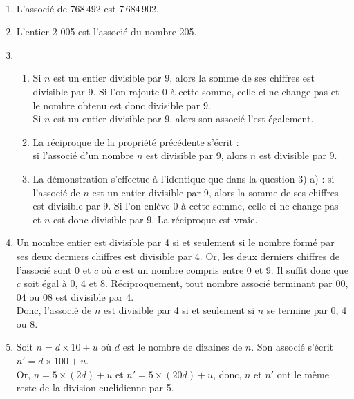\ \\ [-5mm]
   \begin{enumerate}
      \item {\blue L'associé de 768\,492 est 7\,684\,902.}
      \item {\blue L'entier 2 005 est l'associé du nombre 205.}
      \item
         \begin{enumerate}
            \item Si $n$ est un entier divisible par 9, alors la somme de ses chiffres est divisible par 9. Si l'on rajoute 0 à cette somme, celle-ci ne change pas et le nombre obtenu est donc divisible par 9. \\
               {\blue Si $n$ est un entier divisible par 9, alors son associé l'est également.}
            \item La réciproque de la propriété précédente s'écrit : \\
               {\blue si l'associé d'un nombre $n$ est divisible par 9, alors $n$ est divisible par 9.}
             \item La démonstration s'effectue à l'identique que dans la question 3) a) : si l'associé de $n$ est un entier divisible par 9, alors la somme de ses chiffres est divisible par 9. Si l'on  enlève 0 à cette somme, celle-ci ne change pas et $n$ est donc divisible par 9. {\blue La réciproque est vraie.}
         \end{enumerate}
      \setcounter{enumi}{3}
      \item Un nombre entier est divisible par 4 si et seulement si le nombre formé par ses deux derniers chiffres est divisible par 4. Or, les deux derniers chiffres de l'associé sont 0 et $c$ où $c$ est un nombre compris entre 0 et 9. Il suffit donc que $c$ soit égal à 0, 4 et 8. Réciproquement, tout nombre associé terminant par 00, 04 ou 08 est divisible par 4. \\
         Donc, {\blue l'associé de $n$ est divisible par 4 si et seulement si $n$ se termine par 0, 4 ou 8.}
      \item Soit $n=d\times10+u$ où $d$ est le nombre de dizaines de $n$. Son associé s'écrit $n'=d\times100+u$. \\
         Or, $n=5\times(2d)+u$ et $n'=5\times(20d)+u$, donc, {\blue $n$ et $n'$ ont le même reste de la division euclidienne par 5.}
   \end{enumerate}
